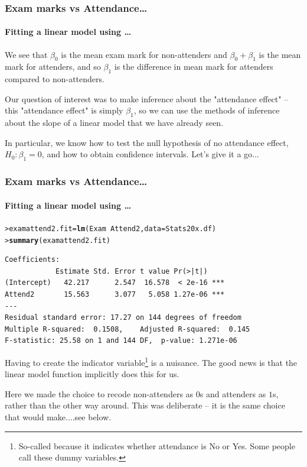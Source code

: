 \documentclass{beamer}\usepackage[]{graphicx}\usepackage[]{xcolor}
\makeatletter
\newcommand{\hlopt}[1]{\textcolor[rgb]{0,0,0}{#1}}%
\newcommand{\hlstd}[1]{\textcolor[rgb]{0.345,0.345,0.345}{#1}}%
\newcommand{\hlkwb}[1]{\textcolor[rgb]{0.69,0.353,0.396}{#1}}%
\newcommand{\hlkwc}[1]{\textcolor[rgb]{0.333,0.667,0.333}{#1}}%
\newcommand{\hlkwd}[1]{\textcolor[rgb]{0.737,0.353,0.396}{\textbf{#1}}}%
\newenvironment{kframe}{%
 \def\at@end@of@kframe{}%
 \ifinner\ifhmode%
  \def\at@end@of@kframe{\end{minipage}}%
  \begin{minipage}{\columnwidth}%
 \fi\fi%
 \def\FrameCommand##1{\hskip\@totalleftmargin \hskip-\fboxsep
 \colorbox{shadecolor}{##1}\hskip-\fboxsep
     \hskip-\linewidth \hskip-\@totalleftmargin \hskip\columnwidth}%
 \MakeFramed {\advance\hsize-\width
   \@totalleftmargin\z@ \linewidth\hsize
   \@setminipage}}%
 {\par\unskip\endMakeFramed%
 \at@end@of@kframe}
\newenvironment{knitrout}{}{} %
\makeatother
\begin{document}
\begin{frame}[fragile]
\frametitle{Exam marks vs Attendance\ldots}
\framesubtitle{Fitting a linear model using \ldots}
We see that $\beta_0$ is the mean exam mark for non-attenders and $\beta_0+\beta_1$ is the mean mark for attenders, and so $\beta_1$ is the difference in mean mark for attenders compared to non-attenders.
\bigskip

Our question of interest was to make inference about the "attendance effect" -- this "attendance effect" is simply $\beta_1$, so we can use the methods of inference about the slope of a linear model that we have already seen.
\bigskip

In particular, we know how to test the null hypothesis of no attendance effect, $H_0: \beta_1=0$, and how to obtain confidence intervals. Let's give it a go...


\end{frame}




\begin{frame}[fragile]
\frametitle{Exam marks vs Attendance\ldots}
\framesubtitle{Fitting a linear model using \ldots}

\medskip
\begin{knitrout}\scriptsize
{}\color{fgcolor}\begin{kframe}
\begin{alltt}
\hlstd{> }\hlstd{examattend2.fit} \hlkwb{=} \hlkwd{lm}\hlstd{(Exam}\hlopt{~} \hlstd{Attend2,} \hlkwc{data} \hlstd{= Stats20x.df)}
\hlstd{> }\hlkwd{summary}\hlstd{(examattend2.fit)}
\end{alltt}
\end{kframe}
\end{knitrout}

\begin{knitrout}\scriptsize
{}\color{fgcolor}\begin{kframe}
\begin{verbatim}
Coefficients:
            Estimate Std. Error t value Pr(>|t|)    
(Intercept)   42.217      2.547  16.578  < 2e-16 ***
Attend2       15.563      3.077   5.058 1.27e-06 ***
---
Residual standard error: 17.27 on 144 degrees of freedom
Multiple R-squared:  0.1508,	Adjusted R-squared:  0.145 
F-statistic: 25.58 on 1 and 144 DF,  p-value: 1.271e-06
\end{verbatim}
\end{kframe}
\end{knitrout}
Having to create the indicator variable\footnote{So-called because it indicates whether attendance is No or Yes. Some people call these dummy variables.}  is a nuisance.
The good news is that the linear model function  implicitly does this for us.
\medskip

Here we made the choice to recode non-attenders as $0$s and attenders as $1$s, rather than the other way around. This was deliberate -- it is the same choice that  would make....see below.
\end{frame}
\end{document}
